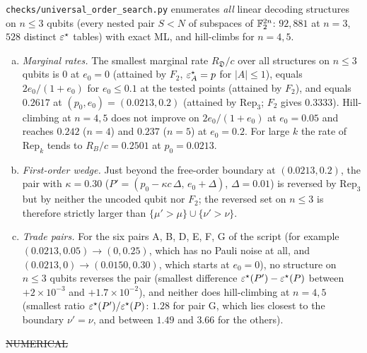 \begin{observation}\label{obs:search}
\texttt{checks/universal\_order\_search.py} enumerates \emph{all} linear decoding structures on $n\le3$ qubits (every nested pair $S<N$ of subspaces of $\mathbb{F}_2^{2n}$: $92{,}881$ at $n=3$, $528$ distinct $\varepsilon^{\star}$ tables) with exact ML, and hill-climbs for $n=4,5$.
\begin{enumerate}[(a)]
\item \emph{Marginal rates.} The smallest marginal rate $R_{\mathfrak D}/c$ over all structures on $n\le3$ qubits is $0$ at $e_0=0$ (attained by $F_2$, $\varepsilon^{\star}_A=p$ for $|A|\le1$), equals $2e_0/(1+e_0)$ for $e_0\le0.1$ at the tested points (attained by $F_2$), and equals $0.2617$ at $(p_0,e_0)=(0.0213,0.2)$ (attained by $\mathrm{Rep}_3$; $F_2$ gives $0.3333$). Hill-climbing at $n=4,5$ does not improve on $2e_0/(1+e_0)$ at $e_0=0.05$ and reaches $0.242$ ($n=4$) and $0.237$ ($n=5$) at $e_0=0.2$. For large $k$ the rate of $\mathrm{Rep}_k$ tends to $R_B/c=0.2501$ at $p_0=0.0213$.
\item \emph{First-order wedge.} Just beyond the free-order boundary at $(0.0213,0.2)$, the pair with $\kappa=0.30$ ($P'=(p_0-\kappa c\,\Delta,\,e_0+\Delta)$, $\Delta=0.01$) is reversed by $\mathrm{Rep}_3$ but by neither the uncoded qubit nor $F_2$; the reversed set on $n\le3$ is therefore strictly larger than $\{\mu'>\mu\}\cup\{\nu'>\nu\}$.
\item \emph{Trade pairs.} For the six pairs A, B, D, E, F, G of the script (for example $(0.0213,0.05)\to(0,0.25)$, which has no Pauli noise at all, and $(0.0213,0)\to(0.0150,0.30)$, which starts at $e_0=0$), no structure on $n\le3$ qubits reverses the pair (smallest difference $\varepsilon^{\star}(P')-\varepsilon^{\star}(P)$ between $+2\times10^{-3}$ and $+1.7\times10^{-2}$), and neither does hill-climbing at $n=4,5$ (smallest ratio $\varepsilon^{\star}(P')/\varepsilon^{\star}(P)$: $1.28$ for pair G, which lies closest to the boundary $\nu'=\nu$, and between $1.49$ and $3.66$ for the others).
\end{enumerate}
\hfill\st{NUMERICAL}
\end{observation}

